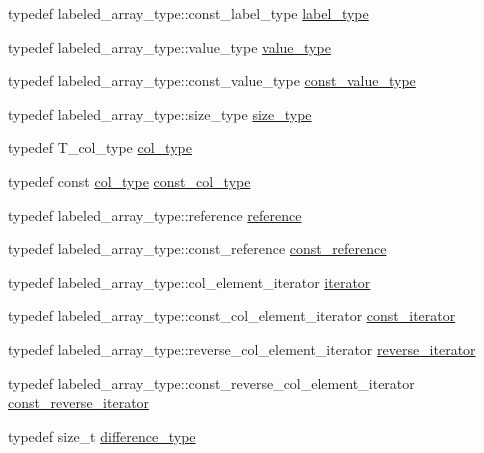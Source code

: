 \begin{DoxyCompactItemize}
\item 
typedef labeled\+\_\+array\+\_\+type\+::const\+\_\+label\+\_\+type \hyperlink{classIceBRG_1_1labeled__array__col__reference_a8dc48f0fd0cd4b9813289a8b6db0f9b6}{label\+\_\+type}
\item 
typedef labeled\+\_\+array\+\_\+type\+::value\+\_\+type \hyperlink{classIceBRG_1_1labeled__array__col__reference_ab9d93b07ec3e0fbfb0604ac8b135d04d}{value\+\_\+type}
\item 
typedef labeled\+\_\+array\+\_\+type\+::const\+\_\+value\+\_\+type \hyperlink{classIceBRG_1_1labeled__array__col__reference_a035a727159f4298ef4f4a360e6bc8aa8}{const\+\_\+value\+\_\+type}
\item 
typedef labeled\+\_\+array\+\_\+type\+::size\+\_\+type \hyperlink{classIceBRG_1_1labeled__array__col__reference_a5b8295af3ddffec129715ff6b7744b7e}{size\+\_\+type}
\item 
typedef T\+\_\+col\+\_\+type \hyperlink{classIceBRG_1_1labeled__array__col__reference_ad55f27046974468dea6e20647571e4e0}{col\+\_\+type}
\item 
typedef const \hyperlink{classIceBRG_1_1labeled__array__col__reference_ad55f27046974468dea6e20647571e4e0}{col\+\_\+type} \hyperlink{classIceBRG_1_1labeled__array__col__reference_a00d71fc36336ea5879c401a111ac53f4}{const\+\_\+col\+\_\+type}
\item 
typedef labeled\+\_\+array\+\_\+type\+::reference \hyperlink{classIceBRG_1_1labeled__array__col__reference_aab5b1a7515a3d5bb8e5ead3f3a8319f6}{reference}
\item 
typedef labeled\+\_\+array\+\_\+type\+::const\+\_\+reference \hyperlink{classIceBRG_1_1labeled__array__col__reference_a2c7ae3d3e5b937e934ad83ea1269127d}{const\+\_\+reference}
\item 
typedef labeled\+\_\+array\+\_\+type\+::col\+\_\+element\+\_\+iterator \hyperlink{classIceBRG_1_1labeled__array__col__reference_a02a1708be2729e266d767b9a58d1880e}{iterator}
\item 
typedef labeled\+\_\+array\+\_\+type\+::const\+\_\+col\+\_\+element\+\_\+iterator \hyperlink{classIceBRG_1_1labeled__array__col__reference_ab7d7f397a1e5f1d9bfc2c61604dda841}{const\+\_\+iterator}
\item 
typedef labeled\+\_\+array\+\_\+type\+::reverse\+\_\+col\+\_\+element\+\_\+iterator \hyperlink{classIceBRG_1_1labeled__array__col__reference_af3dd2856e6301c59896b6219b2c3e3a1}{reverse\+\_\+iterator}
\item 
typedef labeled\+\_\+array\+\_\+type\+::const\+\_\+reverse\+\_\+col\+\_\+element\+\_\+iterator \hyperlink{classIceBRG_1_1labeled__array__col__reference_af8c36128050cef0220fcf8269ecb86da}{const\+\_\+reverse\+\_\+iterator}
\item 
typedef size\+\_\+t \hyperlink{classIceBRG_1_1labeled__array__col__reference_a8b2c27327495b8f17cf4ac9fbf667d54}{difference\+\_\+type}
\end{DoxyCompactItemize}
